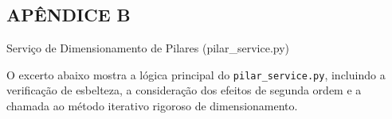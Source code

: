 \newpage
{}
\begin{center}
\section*{APÊNDICE B}
Serviço de Dimensionamento de Pilares (pilar\_service.py)
\end{center}

O excerto abaixo mostra a lógica principal do \texttt{pilar\_service.py}, incluindo a verificação de esbelteza, a consideração dos efeitos de segunda ordem e a chamada ao método iterativo rigoroso de dimensionamento.


